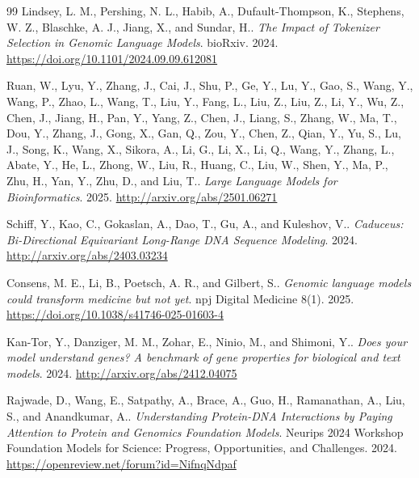 \documentclass{ifacconf}
\begin{document}
\begin{thebibliography}{99}
Lindsey, L. M., Pershing, N. L., Habib, A., Dufault-Thompson, K., Stephens, W. Z., Blaschke, A. J., Jiang, X., and Sundar, H..
\textit{The Impact of Tokenizer Selection in Genomic Language Models}.
bioRxiv. 2024.
\url{https://doi.org/10.1101/2024.09.09.612081}

Ruan, W., Lyu, Y., Zhang, J., Cai, J., Shu, P., Ge, Y., Lu, Y., Gao, S., Wang, Y., Wang, P., Zhao, L., Wang, T., Liu, Y., Fang, L., Liu, Z., Liu, Z., Li, Y., Wu, Z., Chen, J., Jiang, H., Pan, Y., Yang, Z., Chen, J., Liang, S., Zhang, W., Ma, T., Dou, Y., Zhang, J., Gong, X., Gan, Q., Zou, Y., Chen, Z., Qian, Y., Yu, S., Lu, J., Song, K., Wang, X., Sikora, A., Li, G., Li, X., Li, Q., Wang, Y., Zhang, L., Abate, Y., He, L., Zhong, W., Liu, R., Huang, C., Liu, W., Shen, Y., Ma, P., Zhu, H., Yan, Y., Zhu, D., and Liu, T..
\textit{Large Language Models for Bioinformatics}.
2025.
\url{http://arxiv.org/abs/2501.06271}

Schiff, Y., Kao, C., Gokaslan, A., Dao, T., Gu, A., and Kuleshov, V..
\textit{Caduceus: Bi-Directional Equivariant Long-Range DNA Sequence Modeling}.
2024.
\url{http://arxiv.org/abs/2403.03234}

Consens, M. E., Li, B., Poetsch, A. R., and Gilbert, S..
\textit{Genomic language models could transform medicine but not yet}.
npj Digital Medicine 8(1). 2025.
\url{https://doi.org/10.1038/s41746-025-01603-4}

Kan-Tor, Y., Danziger, M. M., Zohar, E., Ninio, M., and Shimoni, Y..
\textit{Does your model understand genes? A benchmark of gene properties for biological and text models}.
2024.
\url{http://arxiv.org/abs/2412.04075}

Rajwade, D., Wang, E., Satpathy, A., Brace, A., Guo, H., Ramanathan, A., Liu, S., and Anandkumar, A..
\textit{Understanding Protein-DNA Interactions by Paying Attention to Protein and Genomics Foundation Models}.
Neurips 2024 Workshop Foundation Models for Science: Progress, Opportunities, and Challenges. 2024.
\url{https://openreview.net/forum?id=NifnqNdpaf}

\end{thebibliography}
\end{document}

